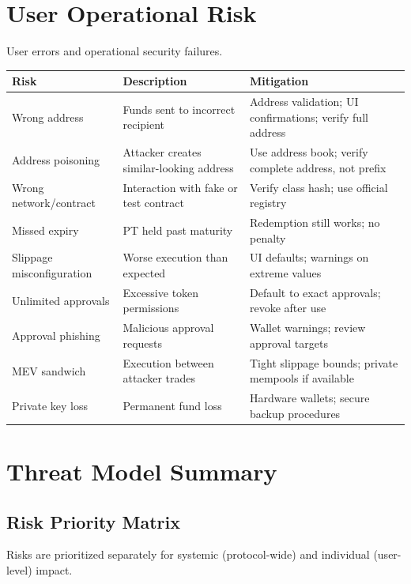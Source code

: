 \section{User Operational Risk}

User errors and operational security failures.

\begin{center}
\begin{tabularx}{\textwidth}{l >{\raggedright\arraybackslash}X >{\raggedright\arraybackslash}X}
\toprule
\textbf{Risk} & \textbf{Description} & \textbf{Mitigation} \\
\midrule
Wrong address & Funds sent to incorrect recipient & Address validation; UI confirmations; verify full address \\
Address poisoning & Attacker creates similar-looking address & Use address book; verify complete address, not prefix \\
Wrong network/contract & Interaction with fake or test contract & Verify class hash; use official registry \\
Missed expiry & PT held past maturity & Redemption still works; no penalty \\
Slippage misconfiguration & Worse execution than expected & UI defaults; warnings on extreme values \\
Unlimited approvals & Excessive token permissions & Default to exact approvals; revoke after use \\
Approval phishing & Malicious approval requests & Wallet warnings; review approval targets \\
MEV sandwich & Execution between attacker trades & Tight slippage bounds; private mempools if available \\
Private key loss & Permanent fund loss & Hardware wallets; secure backup procedures \\
\bottomrule
\end{tabularx}
\end{center}

\section{Threat Model Summary}

\subsection{Risk Priority Matrix}

Risks are prioritized separately for systemic (protocol-wide) and individual (user-level) impact.


